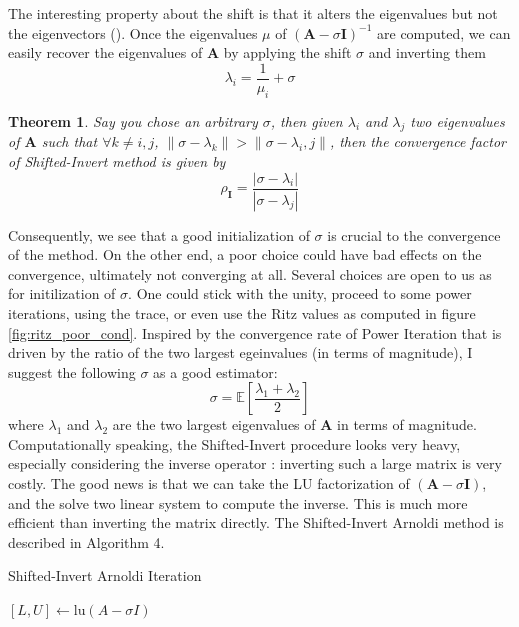 \documentclass[11pt]{article}
\newtheorem{theorem}{Theorem}[section]
\numberwithin{equation}{section}
\begin{document}
The interesting property about the shift is that it alters the eigenvalues but not the eigenvectors (\cite{saad2011numerical}). Once the eigenvalues $\mu$ of $(\mathbf{A}-\sigma\mathbf{I})^{-1}$ are computed, we can easily recover the eigenvalues of $\mathbf{A}$ by applying the shift $\sigma$ and inverting them
\begin{equation*}
    \lambda_i = \frac{1}{\mu_i} + \sigma
\end{equation*}
\begin{theorem}
    Say you chose an arbitrary $\sigma$, then given $\lambda_i$ and $\lambda_j$ two eigenvalues of $\mathbf{A}$ such that $\forall k \neq i,j$, $\|\sigma-\lambda_k\| > \|\sigma-\lambda_i,j\|$, then the convergence factor of Shifted-Invert method is given by 
    \begin{equation}
        \rho_{\mathbf{I}} = \frac{|\sigma-\lambda_i|}{|\sigma-\lambda_j|}
    \end{equation}
\end{theorem}
Consequently, we see that a good initialization of $\sigma$ is crucial to the convergence of the method. On the other end, a poor choice could have bad effects on the convergence, ultimately not converging at all. Several choices are open to us as for initilization of $\sigma$. One could stick with the unity, proceed to some power iterations, using the trace, or even use the Ritz values as computed in figure \ref{fig:ritz_poor_cond}. Inspired by the convergence rate of Power Iteration that is driven by the ratio of the two largest egeinvalues (in terms of magnitude), I suggest the following $\sigma$ as a good estimator:
\begin{equation}
    \sigma = \mathbb{E}\left[\frac{\lambda_1+\lambda_2}{2}\right]
\end{equation}
where $\lambda_1$ and $\lambda_2$ are the two largest eigenvalues of $\mathbf{A}$ in terms of magnitude. Computationally speaking, the Shifted-Invert procedure looks very heavy, especially considering the inverse operator : inverting such a large matrix is very costly. The good news is that we can take the LU factorization of $(\mathbf{A}-\sigma\mathbf{I})$, and the solve two linear system to compute the inverse. This is much more efficient than inverting the matrix directly. The Shifted-Invert Arnoldi method is described in Algorithm 4.
\begin{algorithm2e}
    \SetAlgoLined
    \caption{Shifted-Invert Arnoldi Iteration}
    $[L,U] \gets \text{lu}(A-\sigma I)$\;
\end{algorithm2e}
\end{document}

